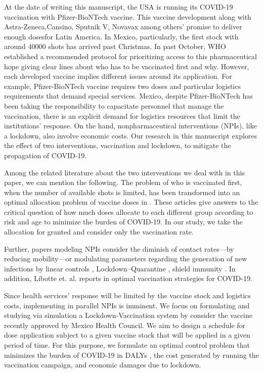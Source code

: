 
At the date of writing this manuscript, the USA is running its COVID-19 
vaccination with Pfizer-BioNTech vaccine. This vaccine development along with 
Astra-Zeneca,Cansino, Sputnik V, Novavax among others' promise to deliver 
enough dosesfor Latin America. In Mexico, particularly, the first stock with 
around \num{40 000} shots has arrived past Christmas. In past October, WHO 
established a recommended protocol for prioritizing access to this
pharmaceutical hope giving clear lines about who has to be vaccinated first
and why. However, each developed vaccine implies different issues around its
application. For example, Pfizer-BioNTech vaccine requires two doses and
particular logistics requirements that demand special services. 
Mexico, despite Pfizer-BioNTech has been taking the responsibility to 
capacitate personnel that manage the vaccination, there is an explicit demand 
for logistics resources that limit the institutions' response. On the hand, 
nonpharmaceutical interventions (NPIs), like a lockdown, also involve economic 
costs.  Our research in this manuscript explores the effect of two 
interventions, vaccination and lockdown, to mitigate the  propagation of 
COVID-19.

	Among the related literature about the two interventions we deal with in this 
paper, we can mention the following. The problem of who is vaccinated first, 
when the number of  available shots is limited, has been transformed into an 
optimal allocation problem of vaccine doses in \cite{Bubar2020,Matrajt2020}.  
These articles give answers to the critical question of how much doses 
allocate to each different group according to risk and age to minimize the 
burden of COVID-19. In our study, we take the allocation for granted and 
consider only the vaccination rate. 

Further, papers modeling NPIs consider the diminish of contact rates---by
reducing mobility---or modulating parameters regarding the generation of new
infections by linear controls \cite{Naraigh2020,Ullah2020},
Lockdown--Quarantine \cite{Mandal2020},  shield immunity
\cite{Weitz2020}. In addition, Libotte et. al. reports in \cite{Libotte2020}
optimal vaccination strategies for COVID-19.

    Since health services' response will be limited by the vaccine stock
and logistics costs, implementing in parallel NPIs is imminent. We focus on
formulating and studying via simulation a Lockdown-Vaccination system by 
consider the vaccine recently approved by  Mexico Health Council.     We aim to 
design a schedule for dose application subject to a given vaccine stock that 
will be applied in a given period of time. For this purpose, we formulate an 
optimal control problem that minimizes the burden of  COVID-19 in DALYs 
\cite{WhoDALY}, the cost generated by   running the vaccination 
campaign, and economic damages due to lockdown.

